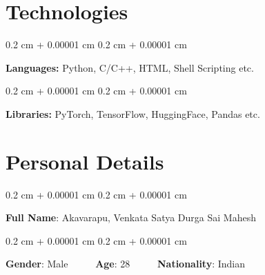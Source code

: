 \documentclass[12pt, letterpaper]{article}
\newenvironment{onecolentry}{
    \begin{adjustwidth}{
        0.2 cm + 0.00001 cm
    }{
        0.2 cm + 0.00001 cm
    }
}{
    \end{adjustwidth}
} %
\begin{document}
    \section{Technologies}



        
        \begin{onecolentry}
            \textbf{Languages:} Python, C/C++, HTML, Shell Scripting etc.
        \end{onecolentry}

        \vspace{0.2 cm}

        \begin{onecolentry}
            \textbf{Libraries:} PyTorch, TensorFlow, HuggingFace, Pandas etc.
        \end{onecolentry}


    
    \section{Personal Details}



        
        \begin{onecolentry}
            \textbf{Full Name}: Akavarapu, Venkata Satya Durga Sai Mahesh
        \end{onecolentry}

        \vspace{0.2 cm}

        \begin{onecolentry}
            \textbf{Gender}: Male \ \ \ \ \ \textbf{Age}: 28 \ \ \ \ \ \textbf{Nationality}: Indian
        \end{onecolentry}


    
\end{document}
